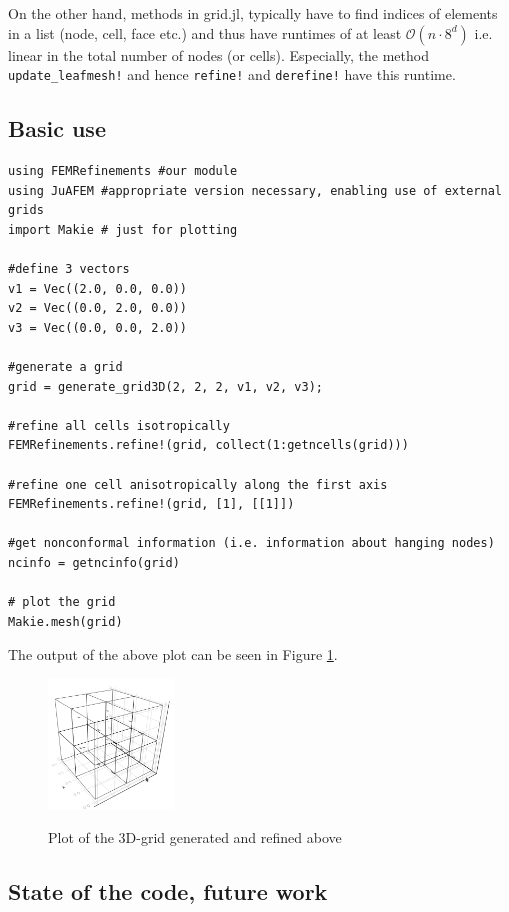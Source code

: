 \documentclass{article}
\begin{document}
On the other hand, methods in grid.jl, typically have to find indices of elements in a list (node, cell, face etc.) and thus have runtimes of at least $\mathcal O(n\cdot 8^d)$ i.e. linear in the total number of nodes (or cells). Especially, the method \texttt{update\_leafmesh!} and hence \texttt{refine!} and \texttt{derefine!} have this runtime.




\subsection{Basic use}

\begin{lstlisting}
using FEMRefinements #our module
using JuAFEM #appropriate version necessary, enabling use of external grids
import Makie # just for plotting 

#define 3 vectors
v1 = Vec((2.0, 0.0, 0.0))
v2 = Vec((0.0, 2.0, 0.0))
v3 = Vec((0.0, 0.0, 2.0))

#generate a grid
grid = generate_grid3D(2, 2, 2, v1, v2, v3);

#refine all cells isotropically
FEMRefinements.refine!(grid, collect(1:getncells(grid)))

#refine one cell anisotropically along the first axis
FEMRefinements.refine!(grid, [1], [[1]])

#get nonconformal information (i.e. information about hanging nodes)
ncinfo = getncinfo(grid)

# plot the grid
Makie.mesh(grid)
\end{lstlisting}
The output of the above plot can be seen in Figure \ref{basicex}.

\begin{figure}[h!]
\centering
\includegraphics[width=0.3\textwidth]{images/example-3d-grid.png}\\
\caption{Plot of the 3D-grid generated and refined above}
\label{basicex}
\end{figure}


\newpage
\subsection{State of the code, future work}
\end{document}

